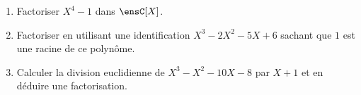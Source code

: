\begin{enumerate}
    \item Factoriser $X^4 - 1$ dans $\ensC[X]$.
    \item Factoriser en utilisant une identification $X^3 - 2X^2 - 5X + 6$ sachant que $1$ est une racine de ce polynôme.
    \item Calculer la division euclidienne de $X^3 - X^2 - 10X - 8$ par $X + 1$ et en déduire une factorisation.
\end{enumerate}
